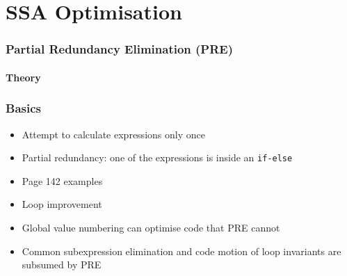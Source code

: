 \documentclass[a4paper,12pt, notitlepage]{article}
\begin{document}
\section*{SSA Optimisation}
\subsubsection*{Partial Redundancy Elimination (PRE)}
\paragraph*{Theory}
\subsubsection*{Basics}
\begin{itemize}
\item Attempt to calculate expressions only once
\item Partial redundancy: one of the expressions is inside an \texttt{if-else}
\item Page 142 examples
\item Loop improvement 
\item Global value numbering can optimise code that PRE cannot
\item Common subexpression elimination and code motion of loop invariants are
subsumed by PRE
\end{itemize}
\end{document}
